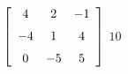 {$\left[ \begin {array}{ccc} 4&2&-1\\\noalign{\medskip}-4&1&4
\\\noalign{\medskip}0&-5&5\end {array} \right]$} 
{$10$}



  


